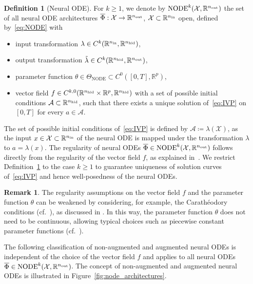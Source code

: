 \documentclass[10pt]{article}
\theoremstyle{definition}
\newtheorem{definition}[theorem]{Definition}
\newtheorem{remark}[theorem]{Remark}
\numberwithin{equation}{section}
\newcommand{\R}{\mathbb{R}}
\newcommand*{\nout}{n_\textup{out}}
\newcommand*{\nhid}{n_\textup{hid}}
\newcommand*{\nin}{n_\textup{in}}
\newcommand*{\NODE}{\textup{NODE}^k(\mathcal{X},\R^{\nout})}
\begin{document}
\begin{definition}[Neural ODE] \label{def:node}
    For $k \geq 1$, we denote by $\NODE$ the set of all neural ODE architectures $\overline{\Phi}: \mathcal{X} \rightarrow \R^{\nout}$, $\mathcal{X}\subset \R^{\nin}$ open, defined by~\eqref{eq:NODE} with 
    \begin{itemize}
        \item input transformation $\lambda \in C^k(\R^{\nin},\R^{\nhid})$,
        \item output transformation $\tilde\lambda \in C^k(\R^{\nhid},\R^{\nout})$,
        \item parameter function $\theta \in \Theta_{\text{NODE}} \subset C^0([0,T],\R^p)$,
        \item vector field $f \in C^{k,0}(\R^{\nhid} \times \R^p, \R^{\nhid})$ with a set of possible initial conditions $\mathcal{A} \subset \R^{\nhid}$, such that there exists a unique solution of~\eqref{eq:IVP} on $[0,T]$ for every $a \in \mathcal{A}$.
    \end{itemize}
\end{definition}

The set of possible initial conditions of~\eqref{eq:IVP} is defined by $\mathcal{A} \coloneqq \lambda(\mathcal{X})$, as the input $x \in \mathcal{X} \subset \R^{\nin}$ of the neural ODE is mapped under the transformation $\lambda$ to $a = \lambda(x)$. The regularity of neural ODEs $\overline{\Phi} \in \NODE$ follows directly from the regularity of the vector field $f$, as explained in~\cite[Lemma 4.3]{kk2025}. We restrict Definition~\ref{def:node} to the case $k \geq 1$ to guarantee uniqueness of solution curves of~\eqref{eq:IVP} and hence well-posedness of the neural ODEs.

\begin{remark}
    The regularity assumptions on the vector field $f$ and the parameter function $\theta$ can be weakened by considering, for example, the Carathéodory conditions (cf.~\cite{Hale1977}), as discussed in \cite{Kuehn2023}. In this way, the parameter function $\theta$ does not need to be continuous, allowing typical choices such as piecewise constant parameter functions (cf.~\cite{Chen2018}).
\end{remark}

The following classification of non-augmented and augmented neural ODEs is independent of the choice of the vector field $f$ and applies to all neural ODEs $\overline{\Phi}\in \NODE$. The concept of non-augmented and augmented neural ODEs is illustrated in Figure~\ref{fig:node_architectures}. 
\end{document}
